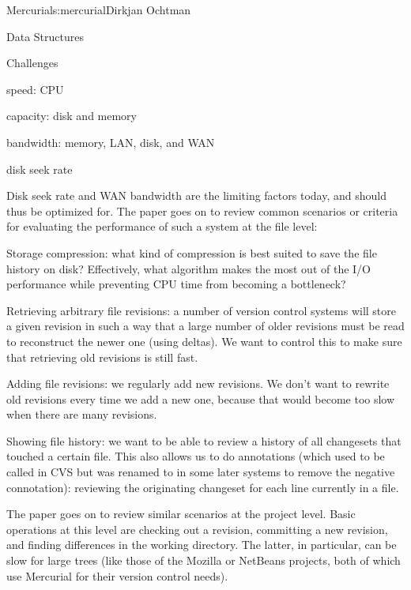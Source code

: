 \begin{aosachapter}{Mercurial}{s:mercurial}{Dirkjan Ochtman}
\begin{aosasect1}{Data Structures}
\begin{aosasect2}{Challenges}
\begin{aosaitemize}

  \item speed: CPU

  \item capacity: disk and memory

  \item bandwidth: memory, LAN, disk, and WAN

  \item disk seek rate

\end{aosaitemize}

Disk seek rate and WAN bandwidth are the limiting factors today, and
should thus be optimized for. The paper goes on to review common
scenarios or criteria for evaluating the performance of such a system
at the file level:

\begin{aosaitemize}

  \item Storage compression: what kind of compression is best suited
  to save the file history on disk? Effectively, what algorithm makes
  the most out of the I/O performance while preventing CPU time
  from becoming a bottleneck?

  \item Retrieving arbitrary file revisions: a number of version control
  systems will store a given revision in such a way that a large
  number of older revisions must be read to reconstruct the newer one
  (using deltas). We want to control this to make sure that retrieving
  old revisions is still fast.

  \item Adding file revisions: we regularly add new revisions. We don't
  want to rewrite old revisions every time we add a new one, because
  that would become too slow when there are many revisions.

  \item Showing file history: we want to be able to review a history of
  all changesets that touched a certain file. This also allows us to
  do annotations (which used to be called  in CVS but was
  renamed to  in some later systems to remove the
  negative connotation): reviewing the originating changeset for each
  line currently in a file.

\end{aosaitemize}

The paper goes on to review similar scenarios at the project level.
Basic operations at this level are checking out a revision, committing
a new revision, and finding differences in the working directory. The
latter, in particular, can be slow for large trees (like those of the
Mozilla or NetBeans projects, both of which use Mercurial for their
version control needs).


\end{aosasect2}
\end{aosasect1}
\end{aosachapter}
